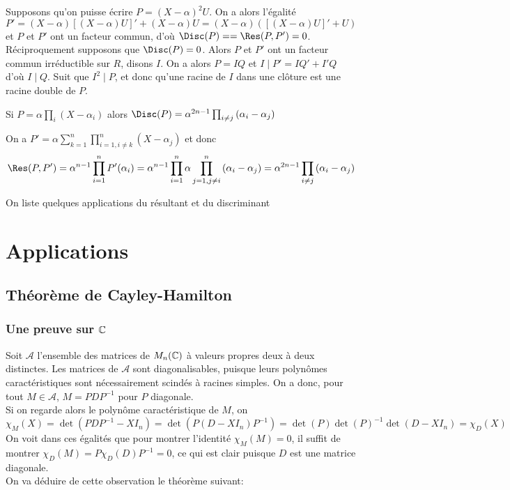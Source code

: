 \documentclass{article}
\begin{document}
\begin{preuve}
    Supposons qu'on puisse écrire $P = (X-\alpha)^2U$. On a alors l'égalité
    $$P' = (X-\alpha)[(X-\alpha)U]' + (X-\alpha)U = (X-\alpha)([(X-\alpha)U]' + U)$$
    et $P$ et $P'$ ont un facteur commun, d'où $\Disc(P) = = \Res(P, P') = 0$.\\
    Réciproquement supposons que $\Disc(P) = 0$. Alors $P$ et $P'$ ont un facteur commun irréductible sur $R$, disons $I$. On a alors $P = IQ$ et $I \mid P' = IQ' + I'Q$ d'où $I \mid Q$. Suit que $I^2 \mid P$, et donc qu'une racine de $I$ dans une clôture est une racine double de $P$.
\end{preuve}

\begin{proposition}
    Si $P = \alpha\prod_{i}{(X-\alpha_i)}$ alors $\Disc(P) = \alpha^{2n-1}\prod_{i \neq j}{(\alpha_i-\alpha_j)}$
\end{proposition}

\begin{preuve}
    On a $P' = \alpha\sum_{k=1}^{n}\prod_{i=1, i \neq k}^{n}{(X-\alpha_j)}$ et donc
    $$\Res(P, P')  = \alpha^{n-1}\prod_{i=1}^{n}{P'(\alpha_i)} = \alpha^{n-1} \prod_{i=1}^{n}{\alpha\prod_{j=1, j \neq i}^{n}{(\alpha_i-\alpha_j)}} = \alpha^{2n-1}\prod_{i \neq j}{(\alpha_i-\alpha_j)}$$
\end{preuve}

On liste quelques applications du résultant et du discriminant

\section{Applications}

\subsection{Théorème de Cayley-Hamilton}

\subsubsection{Une preuve sur $\mathbb{C}$}

Soit $\mathcal{A}$ l'ensemble des matrices de $M_n(\mathbb{C})$ à valeurs propres deux à deux distinctes. Les matrices de $\mathcal{A}$ sont diagonalisables, puisque leurs polynômes caractéristiques sont nécessairement scindés à racines simples. On a donc, pour tout $M \in \mathcal{A}$, $M = PDP^{-1}$ pour $P$ diagonale.\\
Si on regarde alors le polynôme caractéristique de $M$, on
$$\chi_M(X) = \det(PDP^{-1} - XI_n) = \det(P(D - XI_n)P^{-1}) = \det(P)\det(P)^{-1}\det(D - XI_n) = \chi_D(X)$$
On voit dans ces égalités que pour montrer l'identité $\chi_M(M) = 0$, il suffit de montrer $\chi_D(M) = P\chi_D(D)P^{-1} = 0$, ce qui est clair puisque $D$ est une matrice diagonale.\\
On va déduire de cette observation le théorème suivant:
\end{document}
